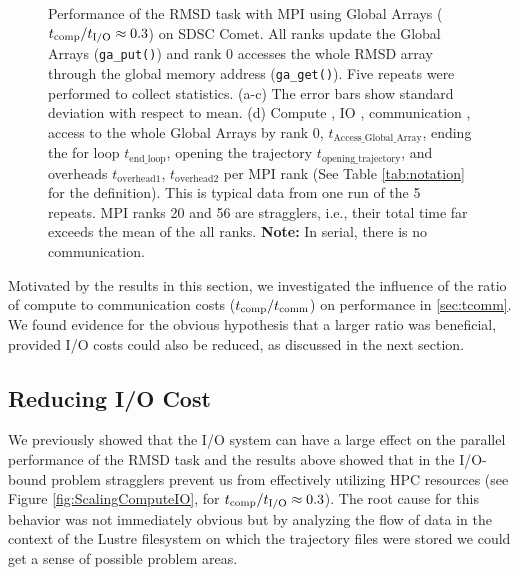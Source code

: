 \begin{figure}[ht!]
\caption{Performance of the RMSD task with MPI using Global Arrays (${t}_{\text{comp}}/{t}_{\text{I/O}} \approx 0.3$) on SDSC Comet.
All ranks update the Global Arrays (\texttt{ga\_put()}) and rank 0 accesses the whole RMSD array through the global memory address (\texttt{ga\_get()}).
Five repeats were performed to collect statistics. (a-c) The error bars show standard deviation with respect to mean. 
(d) Compute \tcomp, IO \tIO, communication \tcomm, access to the whole Global Arrays by rank 0, $t_{\text{Access\_Global\_Array}}$, ending the for loop $t_{\text{end\_loop}}$,
  opening the trajectory $t_{\text{opening\_trajectory}}$, and overheads $t_{\text{overhead1}}$, $t_{\text{overhead2}}$ per MPI rank (See Table \ref{tab:notation} for the definition). 
  This is typical data from one run of the 5 repeats. MPI ranks 20 and 56 are stragglers, i.e., 
their total time far exceeds the mean of the all ranks. \textbf{Note:} In serial, there is no communication.}
\label{fig:MPIwithIO-ga4py}
\end{figure}

Motivated by the results in this section, we investigated the influence of the ratio of compute to communication costs (${t}_{\text{comp}}/t_{\text{comm}}$) on performance in \ref{sec:tcomm}.
We found evidence for the obvious hypothesis that a larger ratio was beneficial, provided I/O costs could also be reduced, as discussed in the next section.



\subsection{Reducing I/O Cost}
\label{sec:I/O}

We previously showed that the I/O system can have a large effect on the parallel performance of the RMSD task \cite{Khoshlessan:2017ab} and the results above showed that in the I/O-bound problem stragglers prevent us from effectively utilizing HPC resources (see Figure \ref{fig:ScalingComputeIO}, for ${t}_{\text{comp}}/{t}_{\text{I/O}} \approx 0.3$).
The root cause for this behavior was not immediately obvious but by analyzing the flow of data in the context of the Lustre filesystem on which the trajectory files were stored  we could get a sense of possible problem areas.

